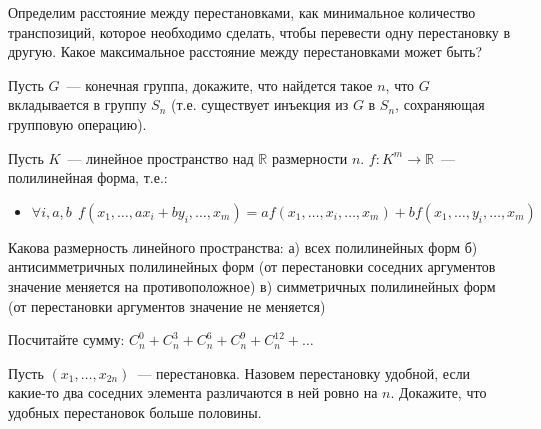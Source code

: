 \setcounter{curtask}{15}


\begin{task}
	Определим расстояние между перестановками, как минимальное количество
	транспозиций, которое необходимо сделать, чтобы перевести одну перестановку в
	другую. Какое максимальное расстояние между перестановками может быть?
\end{task}

\begin{task}
	Пусть $G$~--- конечная группа, докажите, что найдется такое $n$, что $G$
    вкладывается в группу $S_n$ (т.е. существует инъекция из $G$ в $S_n$, сохраняющая
    групповую операцию).
\end{task}

\begin{task}
    Пусть $K$~--- линейное пространство над $\mathbb{R}$ размерности $n$.
    $f: K^m \to \mathbb{R}$~--- полилинейная форма, т.е.:
    \begin{itemize}
	    \item $\forall i, a, b ~~ f(x_1, \dots, a x_i + b y_i, \dots, x_m) =
    		a f(x_1, \dots, x_i, \dots, x_m) + b f(x_1, \dots, y_i, \dots, x_m)$
    \end{itemize}
    Какова размерность линейного пространства:
    а) всех полилинейных форм
    б) антисимметричных полилинейных форм (от перестановки соседних аргументов
    значение меняется на противоположное)
    в) симметричных полилинейных форм (от перестановки аргументов значение не меняется)
\end{task}

\begin{task}
    Посчитайте сумму:
    $C_{n}^{0} + C_{n}^{3} + C_{n}^{6} + C_{n}^{9} + C_{n}^{12} + \dots$
\end{task}

\begin{task}
    Пусть $(x_1, \dots, x_{2n})$~--- перестановка. Назовем перестановку удобной, если
    какие-то два соседних элемента различаются в ней ровно на $n$. Докажите, что
    удобных перестановок больше половины.
\end{task}

